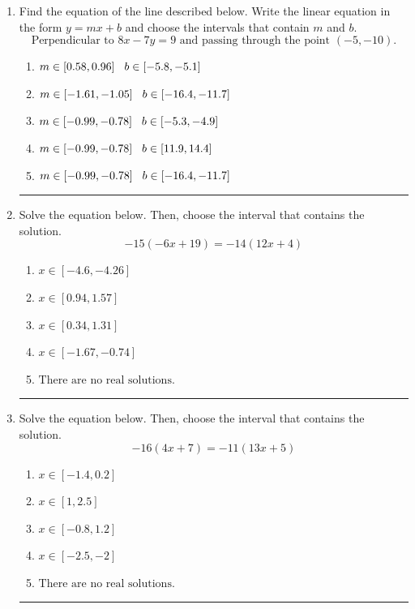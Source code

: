 \documentclass[14pt]{extbook}
\newcommand{\litem}[1]{\item#1\hspace*{-1cm}\rule{\textwidth}{0.4pt}}
\begin{document}
\begin{enumerate}
\litem{
Find the equation of the line described below. Write the linear equation in the form $ y=mx+b $ and choose the intervals that contain $m$ and $b$.\[ \text{Perpendicular to } 8 x - 7 y = 9 \text{ and passing through the point } (-5, -10). \]\begin{enumerate}[label=\Alph*.]
\item \( m \in [0.58, 0.96] \hspace*{3mm} b \in [-5.8, -5.1] \)
\item \( m \in [-1.61, -1.05] \hspace*{3mm} b \in [-16.4, -11.7] \)
\item \( m \in [-0.99, -0.78] \hspace*{3mm} b \in [-5.3, -4.9] \)
\item \( m \in [-0.99, -0.78] \hspace*{3mm} b \in [11.9, 14.4] \)
\item \( m \in [-0.99, -0.78] \hspace*{3mm} b \in [-16.4, -11.7] \)

\end{enumerate} }
\litem{
Solve the equation below. Then, choose the interval that contains the solution.\[ -15(-6x + 19) = -14(12x + 4) \]\begin{enumerate}[label=\Alph*.]
\item \( x \in [-4.6, -4.26] \)
\item \( x \in [0.94, 1.57] \)
\item \( x \in [0.34, 1.31] \)
\item \( x \in [-1.67, -0.74] \)
\item \( \text{There are no real solutions.} \)

\end{enumerate} }
\litem{
Solve the equation below. Then, choose the interval that contains the solution.\[ -16(4x + 7) = -11(13x + 5) \]\begin{enumerate}[label=\Alph*.]
\item \( x \in [-1.4, 0.2] \)
\item \( x \in [1, 2.5] \)
\item \( x \in [-0.8, 1.2] \)
\item \( x \in [-2.5, -2] \)
\item \( \text{There are no real solutions.} \)


\end{enumerate}}
\end{enumerate}
\end{document}
